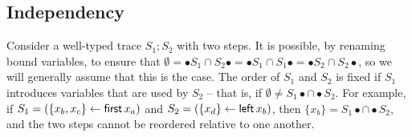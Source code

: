 \subsection{Independency}
\label{sec:independency}

Consider a well-typed trace $S_1; S_2$ with two steps. It is possible,
by renaming bound variables, to ensure that $\emptyset = {\bullet}S_1
\cap S_2{\bullet} = {\bullet}S_1 \cap S_1{\bullet} = {\bullet}S_2 \cap
S_2{\bullet}$, so we will generally assume that this is the case.  The
order of $S_1$ and $S_2$ is fixed if $S_1$ introduces variables that
are used by $S_2$ -- that is, if $\emptyset \neq S_1{\bullet} \cap
{\bullet}S_2$. For example, if $S_1 = (\{{x_b, x_c}\} \leftarrow {\sf
  first}\,x_a)$ and $S_2 = (\{{x_d}\} \leftarrow {\sf left}\,x_b)$, then
$\{x_b\} = S_1{\bullet} \cap {\bullet}S_2$, and the two steps cannot
be reordered relative to one another. 

